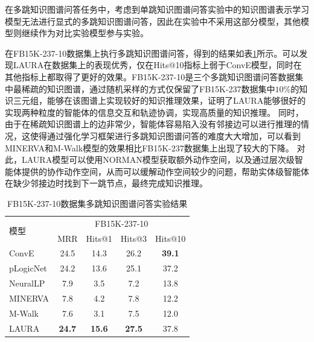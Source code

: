 \documentclass[algorithmlist, AutoFakeBold, AutoFakeSlant, figurelist, tablelist, nomlist, engineering]{seuthesix}
\begin{document}
在多跳知识图谱问答任务中，考虑到单跳知识图谱问答实验中的知识图谱表示学习模型无法进行显式的多跳知识图谱问答，因此在实验中不采用这部分模型，其他模型则继续作为对比实验模型参与实验。

在FB15K-237-10数据集上执行多跳知识图谱问答，得到的结果如表\ref{Experiment2_FB15K-237-10}所示。可以发现LAURA在数据集上的表现优秀，仅在Hits@10指标上弱于ConvE模型，同时在其他指标上都取得了更好的效果。FB15K-237-10是三个多跳知识图谱问答数据集中最稀疏的知识图谱，通过随机采样的方式仅保留了FB15K-237数据集中$10\%$的知识三元组，能够在该图谱上实现较好的知识推理效果，证明了LAURA能够很好的实现两种粒度的智能体的信息交互和轨迹协调，实现高质量的知识推理。
同时，由于在稀疏知识图谱上的边非常少，智能体容易陷入没有邻接边可以进行推理的情况，这使得通过强化学习框架进行多跳知识图谱问答的难度大大增加，可以看到MINERVA和M-Walk模型的效果相比FB15K-237数据集上出现了较大的下降。
对此，LAURA模型可以使用NORMAN模型获取额外动作空间，以及通过层次级智能体提供的协作动作空间，从而可以缓解动作空间较少的问题，帮助实体级智能体在缺少邻接边时找到下一跳节点，最终完成知识推理。
\begin{table}[]
  \centering
  \begin{tabular*}{0.95\textwidth}{@{\extracolsep{\fill}}lcccc}
  \toprule[1pt]
  \multirow{2}{*}{模型} & \multicolumn{4}{c}{FB15K-237-10}   \\
    & MRR & Hits@1 & Hits@3 & Hits@10 \\ \hline
  ConvE & 24.5 & 14.3 & 26.2 & \textbf{39.1} \\
  pLogicNet & 24.2 & 13.6 & 25.1 & 37.2 \\
  NeuralLP & 7.9 & 3.5 & 7.2 & 13.8 \\
  MINERVA & 7.8 & 4.2 & 7.8 & 12.2 \\
  M-Walk & 7.6 & 3.1 & 7.5 & 12.0 \\
  LAURA & \textbf{24.7} & \textbf{15.6} & \textbf{27.5} & 37.8 \\
  \bottomrule[1pt]
  \end{tabular*}
  \caption{FB15K-237-10数据集多跳知识图谱问答实验结果}
  \label{Experiment2_FB15K-237-10}
\end{table}
\end{document}
